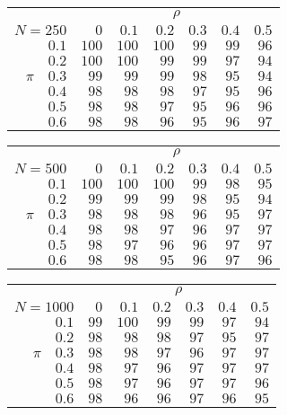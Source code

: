 \begin{tabular}{r|rrrrrr}
\hline\hline
 &\multicolumn{6}{c}{$\rho$} \\ 
 $N = 250$ & $0$ & $0.1$ & $0.2$ & $0.3$ & $0.4$ & $0.5$ \\ 
 \hline$0.1$ & $100$ & $100$ & $100$ & $99$ & $99$ & $96$\\ 
$0.2$ & $100$ & $100$ & $99$ & $99$ & $97$ & $94$\\ 
$\pi\quad$$0.3$ & $99$ & $99$ & $99$ & $98$ & $95$ & $94$\\ 
$0.4$ & $98$ & $98$ & $98$ & $97$ & $95$ & $96$\\ 
$0.5$ & $98$ & $98$ & $97$ & $95$ & $96$ & $96$\\ 
$0.6$ & $98$ & $98$ & $96$ & $95$ & $96$ & $97$\\ 
 \hline 
 \end{tabular}
 
 \vspace{2em} 
 
\begin{tabular}{r|rrrrrr}
\hline\hline
 &\multicolumn{6}{c}{$\rho$} \\ 
 $N = 500$ & $0$ & $0.1$ & $0.2$ & $0.3$ & $0.4$ & $0.5$ \\ 
 \hline$0.1$ & $100$ & $100$ & $100$ & $99$ & $98$ & $95$\\ 
$0.2$ & $99$ & $99$ & $99$ & $98$ & $95$ & $94$\\ 
$\pi\quad$$0.3$ & $98$ & $98$ & $98$ & $96$ & $95$ & $97$\\ 
$0.4$ & $98$ & $98$ & $97$ & $96$ & $97$ & $97$\\ 
$0.5$ & $98$ & $97$ & $96$ & $96$ & $97$ & $97$\\ 
$0.6$ & $98$ & $98$ & $95$ & $96$ & $97$ & $96$\\ 
 \hline 
 \end{tabular}
 
 \vspace{2em} 
 
\begin{tabular}{r|rrrrrr}
\hline\hline
 &\multicolumn{6}{c}{$\rho$} \\ 
 $N = 1000$ & $0$ & $0.1$ & $0.2$ & $0.3$ & $0.4$ & $0.5$ \\ 
 \hline$0.1$ & $99$ & $100$ & $99$ & $99$ & $97$ & $94$\\ 
$0.2$ & $98$ & $98$ & $98$ & $97$ & $95$ & $97$\\ 
$\pi\quad$$0.3$ & $98$ & $98$ & $97$ & $96$ & $97$ & $97$\\ 
$0.4$ & $98$ & $97$ & $96$ & $97$ & $97$ & $97$\\ 
$0.5$ & $98$ & $97$ & $96$ & $97$ & $97$ & $96$\\ 
$0.6$ & $98$ & $96$ & $96$ & $97$ & $96$ & $95$\\ 
 \hline 
 \end{tabular}